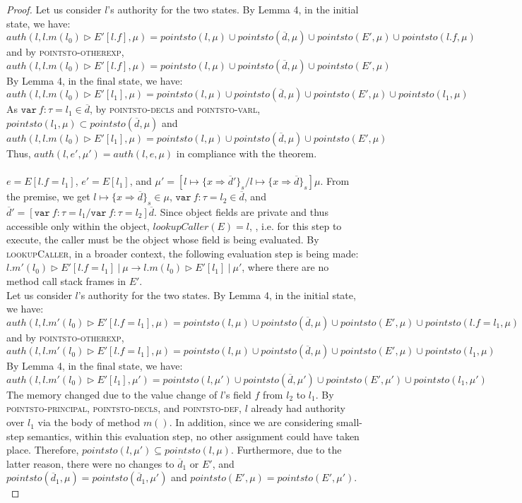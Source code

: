 \documentclass{llncs}
\newcommand{\keywadj}[1]{\mathtt{#1}}
\newcommand{\keyw}[1]{\keywadj{#1}~}
\begin{document}
\begin{proof}
\noindent Let us consider $l$'s authority for the two states. By Lemma 4, in the initial state, we have:
\[
auth(l, l.m(l_0) \rhd E'[l.f], \mu) = pointsto(l, \mu) \cup pointsto(\overline{d}, \mu) \cup pointsto(E', \mu) \cup pointsto(l.f, \mu)
\]
and by \textsc{pointsto-otherexp},
\[
auth(l, l.m(l_0) \rhd E'[l.f], \mu) = pointsto(l, \mu) \cup pointsto(\overline{d}, \mu) \cup pointsto(E', \mu)
\]
By Lemma 4, in the final state, we have:
\[
auth(l, l.m(l_0) \rhd E'[l_1], \mu) = pointsto(l, \mu) \cup pointsto(\overline{d}, \mu) \cup pointsto(E', \mu) \cup pointsto(l_1, \mu)
\]
As $\keyw{var} f : \tau = l_1 \in \overline{d}$, by \textsc{pointsto-decls} and \textsc{pointsto-varl}, $pointsto(l_1, \mu) \subset pointsto(\overline{d}, \mu)$ and
\[
auth(l, l.m(l_0) \rhd E'[l_1], \mu) = pointsto(l, \mu) \cup pointsto(\overline{d}, \mu) \cup pointsto(E', \mu)
\]
Thus, $auth(l, e', \mu') = auth(l, e, \mu)$ in compliance with the theorem.\\\\


\noindent{}
$e = E[l.f = l_1]$, $e' = E[l_1]$, and $\mu' = [l \mapsto \{ x \Rightarrow \overline{d}' \}_{s}/l \mapsto \{ x \Rightarrow \overline{d} \}_{s}]\mu$. From the premise, we get $l \mapsto \{ x \Rightarrow \overline{d} \}_{s} \in \mu$, $\keyw{var} f:\tau = l_2 \in \overline{d}$, and $\overline{d}' = [\keyw{var} f : \tau = l_1/\keyw{var} f:\tau = l_2]\overline{d}$. Since object fields are private and thus accessible only within the object, $lookupCaller(E) = l$, , i.e. for this step to execute, the caller must be the object whose field is being evaluated. By \textsc{lookupCaller}, in a broader context, the following evaluation step is being made: \mbox{$l.m'(l_0) \rhd E'[l.f = l_1]~|~\mu \longrightarrow l.m(l_0) \rhd E'[l_1]~|~\mu'$}, where there are no method call stack frames in $E'$.\\

\noindent Let us consider $l$'s authority for the two states. By Lemma 4, in the initial state, we have:
\[
auth(l, l.m'(l_0) \rhd E'[l.f = l_1], \mu) = pointsto(l, \mu) \cup pointsto(\overline{d}, \mu) \cup pointsto(E', \mu) \cup pointsto(l.f = l_1, \mu)\]
and by \textsc{pointsto-otherexp},
\[
auth(l, l.m'(l_0) \rhd E'[l.f = l_1], \mu) = pointsto(l, \mu) \cup pointsto(\overline{d}, \mu) \cup pointsto(E', \mu) \cup pointsto(l_1, \mu)
\]
By Lemma 4, in the final state, we have:
\[
auth(l, l.m'(l_0) \rhd E'[l_1], \mu') = pointsto(l, \mu') \cup pointsto(\overline{d}, \mu') \cup pointsto(E', \mu') \cup  pointsto(l_1, \mu')
\]
The memory changed due to the value change of $l$'s field $f$ from $l_2$ to $l_1$. By \textsc{pointsto-principal}, \textsc{pointsto-decls}, and \textsc{pointsto-def}, $l$ already had authority over $l_1$ via the body of method $m()$. In addition, since we are considering small-step semantics, within this evaluation step, no other assignment could have taken place. Therefore, $pointsto(l, \mu') \subseteq pointsto(l, \mu)$. Furthermore, due to the latter reason, there were no changes to $\overline{d}_1$ or $E'$, and $pointsto(\overline{d}_1, \mu) = pointsto(\overline{d}_1, \mu')$ and $pointsto(E', \mu) = pointsto(E', \mu')$.\\


\end{proof}
\end{document}
